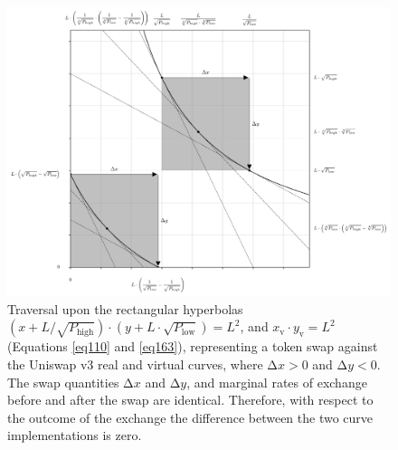 \documentclass{article}
\begin{document}
\begin{figure}[ht]
    \centering
    \includegraphics[width=\textwidth]{fig30.png}
    \captionsetup{
        justification=raggedright,
        singlelinecheck=false,
        font=small,
        labelfont=bf,
        labelsep=quad,
        format=plain
    }
    \caption{Traversal upon the rectangular hyperbolas $\left( x + L / \sqrt{P_{\text{high}}}\right) \cdot \left( y + L \cdot \sqrt{P_{\text{low}}}\right) = L^{2}$, and $x_{\text{v}} \cdot y_{\text{v}} = L^{2}$ (Equations \ref{eq110} and \ref{eq163}), representing a token swap against the Uniswap v3 real and virtual curves, where $\mathrm{\Delta}x > 0$ and $\mathrm{\Delta}y < 0$. The swap quantities $\mathrm{\Delta}x$ and $\mathrm{\Delta}y$, and marginal rates of exchange before and after the swap are identical. Therefore, with respect to the outcome of the exchange the difference between the two curve implementations is zero.}
    \label{fig30}
\end{figure}
\end{document}
